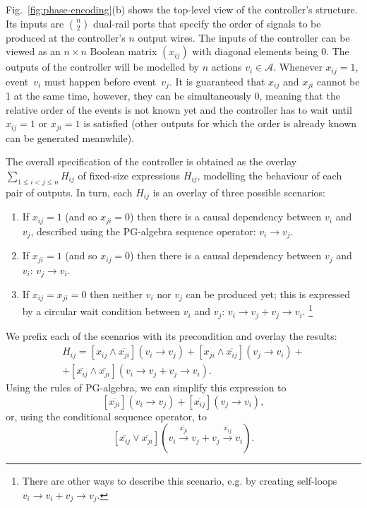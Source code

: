 Fig.~\ref{fig:phase-encoding}(b) shows the top-level view of the
controller's structure. Its inputs are ${n \choose 2}$ dual-rail
ports that specify the order of signals to be produced at the controller's
$n$ output wires. The inputs of the controller can be viewed as an
$n\times n$ Boolean matrix $(x_{ij})$ with diagonal elements being
0. The outputs of the controller will be modelled by $n$ actions
$v_{i}\in\mathcal{A}$. Whenever $x_{ij}=1$, event~$v_{i}$ must
happen before event~$v_{j}$. It is guaranteed that $x_{ij}$ and
$x_{ji}$ cannot be 1 at the same time, however, they can be simultaneously
0, meaning that the relative order of the events is not known yet
and the controller has to wait until $x_{ij}=1$ or $x_{ji}=1$ is
satisfied (other outputs for which the order is already known can
be generated meanwhile). 

The overall specification of the controller is obtained as the overlay
${\displaystyle \sum_{1\le i<j\le n}}H_{ij}$ of fixed-size expressions
$H_{ij}$, modelling the behaviour of each pair of outputs. In turn,
each $H_{ij}$ is an overlay of three possible scenarios:
\begin{enumerate}
\item If $x_{ij}=1$ (and so $x_{ji}=0$) then there is a causal dependency
between $v_{i}$ and $v_{j}$, described using the PG-algebra sequence
operator: $v_{i}\rightarrow v_{j}$. 
\item If $x_{ji}=1$ (and so $x_{ij}=0$) then there is a causal dependency
between $v_{j}$ and $v_{i}$: $v_{j}\rightarrow v_{i}$. 
\item If $x_{ij}=x_{ji}=0$ then neither $v_{i}$ nor $v_{j}$ can be produced
yet; this is expressed by a circular wait condition between $v_{i}$
and $v_{j}$: $v_{i}\rightarrow v_{j}+v_{j}\rightarrow v_{i}$.%
\footnote{There are other ways to describe this scenario, e.g. by creating self-loops
$v_{i}\rightarrow v_{i}+v_{j}\rightarrow v_{j}$.%
} 
\end{enumerate}
We prefix each of the scenarios with its precondition and overlay
the results:
\[
\begin{array}{c}
H_{ij}=[x_{ij}\wedge\overline{x_{ji}}](v_{i}\rightarrow v_{j})+[x_{ji}\wedge\overline{x_{ij}}](v_{j}\rightarrow v_{i})+\\
+[\overline{x_{ij}}\wedge\overline{x_{ji}}](v_{i}\rightarrow v_{j}+v_{j}\rightarrow v_{i}).
\end{array}
\]
Using the rules of PG-algebra, we can simplify this expression to
\[
[\overline{x_{ji}}](v_{i}\rightarrow v_{j})+[\overline{x_{ij}}](v_{j}\rightarrow v_{i}),
\]
or, using the conditional sequence operator, to
\[
[\overline{x_{ij}}\vee\overline{x_{ji}}](v_{i}\overset{\overline{x_{ji}}}{\longrightarrow}v_{j}+v_{j}\overset{\overline{x_{ij}}}{\longrightarrow}v_{i}).
\]


